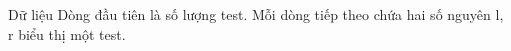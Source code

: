 Dữ liệu
Dòng đầu tiên là số lượng test. Mỗi dòng tiếp theo chứa hai số nguyên l, r biểu thị một test.